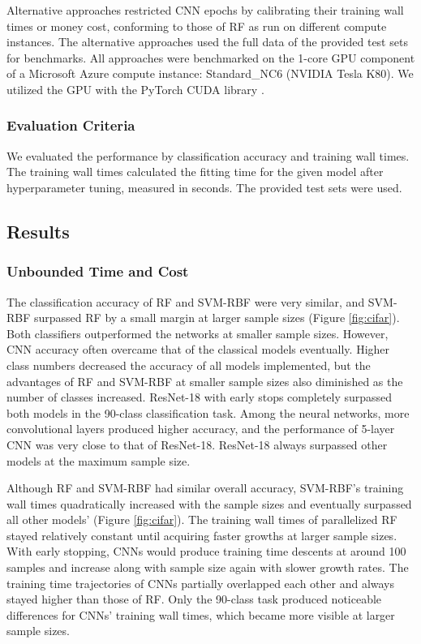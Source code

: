 Alternative approaches restricted CNN epochs by calibrating their training wall times or money cost, conforming to those of RF as run on different compute instances. The alternative approaches used the full data of the provided test sets for benchmarks. All approaches were benchmarked on the 1-core GPU component of a Microsoft Azure compute instance: Standard\_NC6 (NVIDIA Tesla K80).
We utilized the GPU with the PyTorch CUDA library \citep{pytorch}.

\subsubsection{Evaluation Criteria}
We evaluated the performance by classification accuracy and training wall times. The training wall times calculated the fitting time for the given model after hyperparameter tuning, measured in seconds. The provided test sets were used.

\subsection{Results}
\subsubsection{Unbounded Time and Cost}
The classification accuracy of RF and SVM-RBF were very similar, and SVM-RBF surpassed RF by a small margin at larger sample sizes (Figure \ref{fig:cifar}). Both classifiers outperformed the networks at smaller sample sizes. However, CNN accuracy often overcame that of the classical models eventually. Higher class numbers decreased the accuracy of all models implemented, but the advantages of RF and SVM-RBF at smaller sample sizes also diminished as the number of classes increased. ResNet-18 with early stops completely surpassed both models in the 90-class classification task. Among the neural networks, more convolutional layers produced higher accuracy, and the performance of 5-layer CNN was very close to that of ResNet-18. ResNet-18 always surpassed other models at the maximum sample size.

Although RF and SVM-RBF had similar overall accuracy, SVM-RBF's training wall times quadratically increased with the sample sizes and eventually surpassed all other models' (Figure \ref{fig:cifar}). The training wall times of parallelized RF stayed relatively constant until acquiring faster growths at larger sample sizes. With early stopping, CNNs would produce training time descents at around 100 samples and increase along with sample size again with slower growth rates. The training time trajectories of CNNs partially overlapped each other and always stayed higher than those of RF. Only the 90-class task produced noticeable differences for CNNs' training wall times, which became more visible at larger sample sizes.

